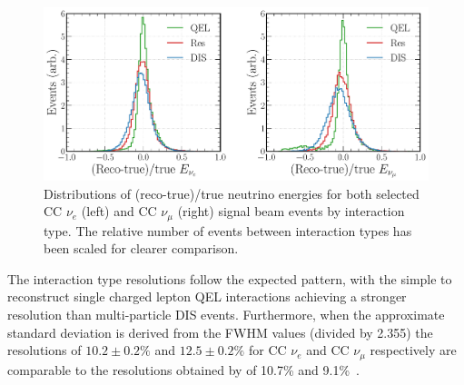 \begin{figure} %
    \includegraphics[width=\textwidth]{diagrams/7-results/final_energy_frac_split.pdf}
    \caption[Distributions of (reco-true)/true neutrino energies by interaction type]
    {Distributions of (reco-true)/true neutrino energies for both selected CC $\nu_{e}$ (left) and
        CC $\nu_{\mu}$ (right) signal beam events by interaction type. The relative number of
        events between interaction types has been scaled for clearer comparison.}
    \label{fig:final_energy_frac_split}
\end{figure}

\begin{table}
    \caption[Summary of CC $\nu_{e}$ and CC $\nu_{\mu}$ FWHM resolutions]
    {Summary of CC $\nu_{e}$ and CC $\nu_{\mu}$ FWHM neutrino energy resolutions. Shown for each
        sample are the FWHM values for all selected signal events and the three dominant
        interaction type components, QEL, Res, and DIS. The FWHM values are calculated from the
        distributions shown in  and
        .}
    \label{tab:energy_resolutions}
\end{table}

The interaction type resolutions follow the expected pattern, with the simple to reconstruct
single charged lepton QEL interactions achieving a stronger resolution than multi-particle DIS
events. Furthermore, when the approximate standard deviation is derived from the FWHM values
(divided by 2.355) the resolutions of $10.2\pm0.2\%$ and $12.5\pm0.2\%$ for CC $\nu_{e}$ and CC
$\nu_{\mu}$ respectively are comparable to the resolutions obtained by \nova of 10.7\% and
9.1\%~\cite{acero2019}.

